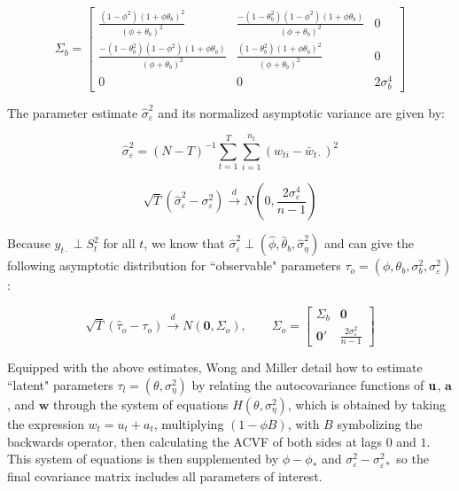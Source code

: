 $$\Sigma_b = \left[ \begin{array}{ccc}
    \frac{(1 - \phi^2)(1 + \phi\theta_b)^2}{(\phi + \theta_b)^2} & \frac{-(1 - \theta_b^2)(1 - \phi^2)(1 + \phi\theta_b)}{(\phi + \theta_b)^2} & 0 \\
    \frac{-(1 - \theta_b^2)(1 - \phi^2)(1 + \phi\theta_b)}{(\phi + \theta_b)^2} & \frac{(1 - \theta_b^2)(1 + \phi\theta_b)^2}{(\phi + \theta_b)^2} & 0 \\
    0 & 0 & 2\sigma_b^4
\end{array} \right] $$



The parameter estimate $\hat{\sigma}_\varepsilon^2$ and its normalized asymptotic variance are given by:

\begin{equation}
    \hat{\sigma}_\varepsilon^2 =(N-T)^{-1}\sum_{t=1}^T\sum_{i=1}^{n_t}(w_{ti}-\bar{w}_{t\cdot})^2 
    \label{eq:var_eps_hat}
\end{equation}


$$\sqrt{T}(\hat{\sigma}_\varepsilon^2 - \sigma_\varepsilon^2) \xrightarrow{d}N(0,\frac{2\sigma_\varepsilon^4}{n-1})$$ 

Because ${y}_{t\cdot} \perp S_t^2$ for all $t$, we know that $\hat{\sigma}_\varepsilon^2 \perp (\hat{\phi},\hat{\theta}_b,\hat{\sigma}_\eta^2)$ and can give the following asymptotic distribution for ``observable" parameters $\tau_o = (\phi,\theta_b,\sigma_b^2,\sigma_\varepsilon^2)$:

\begin{equation}
    \sqrt{T}(\hat{\tau}_o - \tau_o) \xrightarrow{d} N(\mathbf{0},\Sigma_o), \qquad  \Sigma_o = \left[\begin{array}{cc}
        \Sigma_b & \mathbf{0} \\
        \mathbf{0}' & \frac{2\sigma_\varepsilon^2}{n-1}
    \end{array}\right]
    \label{eq:Sigma_o}
\end{equation}


Equipped with the above estimates, Wong and Miller detail how to estimate
 ``latent" parameters $\tau_l = (\theta, \sigma_\eta^2)$ by relating the 
 autocovariance functions of $\mathbf{u}$, $\mathbf{a}$, and $\mathbf{w}$ through the system 
 of equations $H(\theta,\sigma_\eta^2)$, which is obtained by taking the expression
 $w_t = u_t + a_t$, multiplying $(1 - \phi B)$, with $B$ symbolizing the 
 backwards operator, then calculating the ACVF of both sides at lags
 $0$ and $1$. This system of equations is then supplemented by $\phi - \phi_*$ and
 $\sigma_\varepsilon^2 - \sigma_{\varepsilon*}^2$ so the final covariance 
 matrix includes all parameters of interest.

